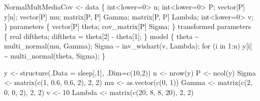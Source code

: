 \documentclass[
  10pt,
  spanish,
]{book}
\newenvironment{Shaded}{\begin{snugshade}}{\end{snugshade}}
\newcommand{\AttributeTok}[1]{\textcolor[rgb]{0.77,0.63,0.00}{#1}}
\newcommand{\DecValTok}[1]{\textcolor[rgb]{0.00,0.00,0.81}{#1}}
\newcommand{\FloatTok}[1]{\textcolor[rgb]{0.00,0.00,0.81}{#1}}
\newcommand{\FunctionTok}[1]{\textcolor[rgb]{0.00,0.00,0.00}{#1}}
\newcommand{\NormalTok}[1]{#1}
\newcommand{\OtherTok}[1]{\textcolor[rgb]{0.56,0.35,0.01}{#1}}
\newcommand{\StringTok}[1]{\textcolor[rgb]{0.31,0.60,0.02}{#1}}
\theoremstyle{definition}
\theoremstyle{definition}
\theoremstyle{definition}
\theoremstyle{definition}
\theoremstyle{remark}
\begin{document}
\begin{Shaded}
\begin{Highlighting}[]
\NormalTok{NormalMultMediaCov }\OtherTok{\textless{}{-}} \StringTok{\textquotesingle{}}
\StringTok{data \{}
\StringTok{  int\textless{}lower=0\textgreater{} n;}
\StringTok{  int\textless{}lower=0\textgreater{} P;}
\StringTok{  vector[P] y[n];}
\StringTok{  vector[P] mu;}
\StringTok{  matrix[P, P] Gamma;}
\StringTok{  matrix[P, P] Lambda;}
\StringTok{  int\textless{}lower=0\textgreater{} v;}
\StringTok{\}}
\StringTok{parameters \{}
\StringTok{  vector[P] theta;}
\StringTok{  cov\_matrix[P] Sigma;}
\StringTok{\}}
\StringTok{transformed parameters \{}
\StringTok{  real diftheta;}
\StringTok{  diftheta = theta[2] {-} theta[1];}
\StringTok{\}}
\StringTok{model \{}
\StringTok{  theta \textasciitilde{} multi\_normal(mu, Gamma);}
\StringTok{  Sigma \textasciitilde{} inv\_wishart(v, Lambda);}
\StringTok{  for (i in 1:n)}
\StringTok{    y[i] \textasciitilde{} multi\_normal(theta, Sigma);}
\StringTok{\}}
\StringTok{\textquotesingle{}}

\NormalTok{y }\OtherTok{\textless{}{-}} \FunctionTok{structure}\NormalTok{(}\AttributeTok{.Data =}\NormalTok{ sleep[,}\DecValTok{1}\NormalTok{], }\AttributeTok{.Dim=}\FunctionTok{c}\NormalTok{(}\DecValTok{10}\NormalTok{,}\DecValTok{2}\NormalTok{))}
\NormalTok{n }\OtherTok{\textless{}{-}} \FunctionTok{nrow}\NormalTok{(y)}
\NormalTok{P }\OtherTok{\textless{}{-}} \FunctionTok{ncol}\NormalTok{(y)}
\NormalTok{Sigma  }\OtherTok{\textless{}{-}} \FunctionTok{matrix}\NormalTok{(}\FunctionTok{c}\NormalTok{(}\DecValTok{1}\NormalTok{, }\FloatTok{0.6}\NormalTok{, }\FloatTok{0.6}\NormalTok{, }\DecValTok{2}\NormalTok{), }\DecValTok{2}\NormalTok{, }\DecValTok{2}\NormalTok{)}
\NormalTok{mu }\OtherTok{\textless{}{-}} \FunctionTok{as.vector}\NormalTok{(}\FunctionTok{c}\NormalTok{(}\DecValTok{0}\NormalTok{, }\DecValTok{1}\NormalTok{))}
\NormalTok{Gamma }\OtherTok{\textless{}{-}} \FunctionTok{matrix}\NormalTok{(}\FunctionTok{c}\NormalTok{(}\DecValTok{2}\NormalTok{, }\DecValTok{0}\NormalTok{, }\DecValTok{0}\NormalTok{, }\DecValTok{2}\NormalTok{), }\DecValTok{2}\NormalTok{, }\DecValTok{2}\NormalTok{)}
\NormalTok{v }\OtherTok{\textless{}{-}} \DecValTok{10}
\NormalTok{Lambda }\OtherTok{\textless{}{-}} \FunctionTok{matrix}\NormalTok{(}\FunctionTok{c}\NormalTok{(}\DecValTok{20}\NormalTok{, }\DecValTok{8}\NormalTok{, }\DecValTok{8}\NormalTok{, }\DecValTok{20}\NormalTok{), }\DecValTok{2}\NormalTok{, }\DecValTok{2}\NormalTok{)}


\end{Highlighting}
\end{Shaded}
\end{document}
